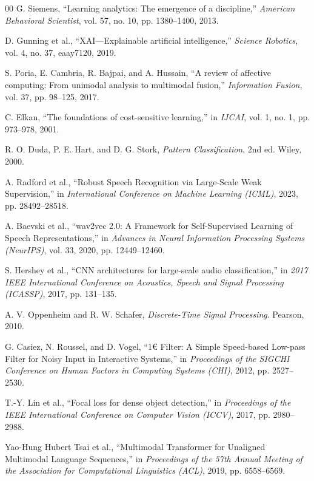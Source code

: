 \documentclass[conference]{IEEEtran}
\begin{document}
\begin{thebibliography}{00}
 G. Siemens, ``Learning analytics: The emergence of a discipline,'' \textit{American Behavioral Scientist}, vol. 57, no. 10, pp. 1380--1400, 2013.

 D. Gunning et al., ``XAI—Explainable artificial intelligence,'' \textit{Science Robotics}, vol. 4, no. 37, eaay7120, 2019.

 S. Poria, E. Cambria, R. Bajpai, and A. Hussain, ``A review of affective computing: From unimodal analysis to multimodal fusion,'' \textit{Information Fusion}, vol. 37, pp. 98--125, 2017.

 C. Elkan, ``The foundations of cost-sensitive learning,'' in \textit{IJCAI}, vol. 1, no. 1, pp. 973--978, 2001.

 R. O. Duda, P. E. Hart, and D. G. Stork, \textit{Pattern Classification}, 2nd ed. Wiley, 2000.

 A. Radford et al., ``Robust Speech Recognition via Large-Scale Weak Supervision,'' in \textit{International Conference on Machine Learning (ICML)}, 2023, pp. 28492--28518.

 A. Baevski et al., ``wav2vec 2.0: A Framework for Self-Supervised Learning of Speech Representations,'' in \textit{Advances in Neural Information Processing Systems (NeurIPS)}, vol. 33, 2020, pp. 12449--12460.

 S. Hershey et al., ``CNN architectures for large-scale audio classification,'' in \textit{2017 IEEE International Conference on Acoustics, Speech and Signal Processing (ICASSP)}, 2017, pp. 131--135.

 A. V. Oppenheim and R. W. Schafer, \textit{Discrete-Time Signal Processing}. Pearson, 2010.

 G. Casiez, N. Roussel, and D. Vogel, ``1€ Filter: A Simple Speed-based Low-pass Filter for Noisy Input in Interactive Systems,'' in \textit{Proceedings of the SIGCHI Conference on Human Factors in Computing Systems (CHI)}, 2012, pp. 2527--2530.

 T.-Y. Lin et al., ``Focal loss for dense object detection,'' in \textit{Proceedings of the IEEE International Conference on Computer Vision (ICCV)}, 2017, pp. 2980--2988.

 Yao-Hung Hubert Tsai et al., ``Multimodal Transformer for Unaligned Multimodal Language Sequences,'' in \textit{Proceedings of the 57th Annual Meeting of the Association for Computational Linguistics (ACL)}, 2019, pp. 6558--6569.


\end{thebibliography}
\end{document}
